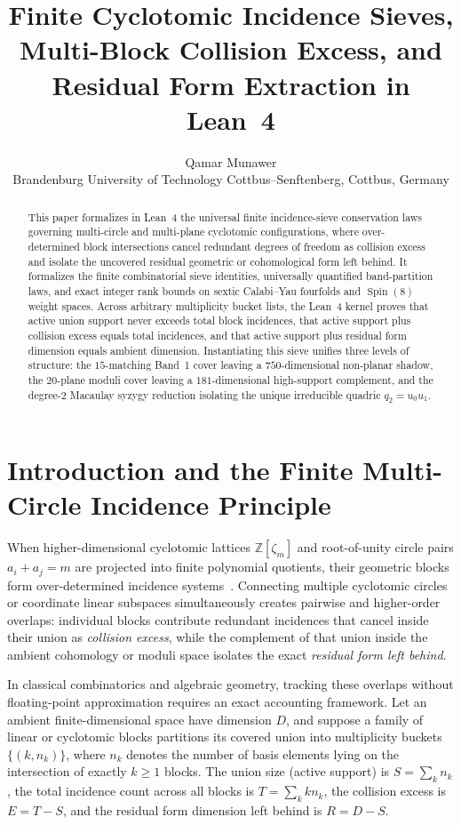 \documentclass[11pt,a4paper]{article}
\title{\textbf{Finite Cyclotomic Incidence Sieves, Multi-Block Collision Excess, and Residual Form Extraction in Lean~4}}
\author{
  Qamar Munawer\\
  \small Brandenburg University of Technology Cottbus--Senftenberg, Cottbus, Germany
}
\date{}
\begin{document}
\maketitle

\begin{abstract}
This paper formalizes in Lean~4 the universal finite incidence-sieve conservation laws governing multi-circle and multi-plane cyclotomic configurations, where over-determined block intersections cancel redundant degrees of freedom as collision excess and isolate the uncovered residual geometric or cohomological form left behind. It formalizes the finite combinatorial sieve identities, universally quantified band-partition laws, and exact integer rank bounds on sextic Calabi--Yau fourfolds and $\operatorname{Spin}(8)$ weight spaces. Across arbitrary multiplicity bucket lists, the Lean~4 kernel proves that active union support never exceeds total block incidences, that active support plus collision excess equals total incidences, and that active support plus residual form dimension equals ambient dimension. Instantiating this sieve unifies three levels of structure: the $15$-matching Band~1 cover leaving a $750$-dimensional non-planar shadow, the $20$-plane moduli cover leaving a $181$-dimensional high-support complement, and the degree-$2$ Macaulay syzygy reduction isolating the unique irreducible quadric $q_2 = u_0 u_1$.
\end{abstract}

\section{Introduction and the Finite Multi-Circle Incidence Principle}

When higher-dimensional cyclotomic lattices $\mathbb{Z}[\zeta_m]$ and root-of-unity circle pairs $a_i + a_j = m$ are projected into finite polynomial quotients, their geometric blocks form over-determined incidence systems~\cite{Shioda1979,Aoki1983}. Connecting multiple cyclotomic circles or coordinate linear subspaces simultaneously creates pairwise and higher-order overlaps: individual blocks contribute redundant incidences that cancel inside their union as \emph{collision excess}, while the complement of that union inside the ambient cohomology or moduli space isolates the exact \emph{residual form left behind}.

In classical combinatorics and algebraic geometry, tracking these overlaps without floating-point approximation requires an exact accounting framework. Let an ambient finite-dimensional space have dimension $D$, and suppose a family of linear or cyclotomic blocks partitions its covered union into multiplicity buckets $\{(k, n_k)\}$, where $n_k$ denotes the number of basis elements lying on the intersection of exactly $k \ge 1$ blocks. The union size (active support) is $S = \sum_k n_k$, the total incidence count across all blocks is $T = \sum_k k n_k$, the collision excess is $E = T - S$, and the residual form dimension left behind is $R = D - S$.
\end{document}
